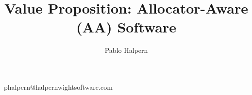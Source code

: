 
\title{Value Proposition: Allocator-Aware (AA) Software}
\author{Pablo Halpern}{phalpern@halpernwightsoftware.com}

